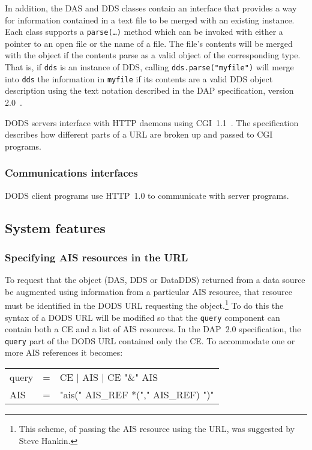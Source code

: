 \documentclass{article}
\begin{document}
In addition, the \ac{DAS} and \ac{DDS} classes contain an interface that
provides a way for information contained in a text file to be merged with an
existing instance.  Each class supports a \texttt{parse(\ldots)} method which
can be invoked with either a pointer to an open file or the name of a file.
The file's contents will be merged with the object if the contents parse as a
valid object of the corresponding type. That is, if \texttt{dds} is an
instance of \ac{DDS}, calling \texttt{dds.parse("myfile")} will merge into
\texttt{dds} the information in \texttt{myfile} if its contents are a valid
\ac{DDS} object description using the text notation described in the \ac{DAP}
specification, version 2.0~\cite{gallagher:dap-spec}.

\ac{DODS} servers interface with \ac{HTTP} daemons using
\ac{CGI}~1.1~\cite{w3c:cgi}. The specification describes how different parts
of a \ac{URL} are broken up and passed to \ac{CGI} programs.

\subsubsection{Communications interfaces}
\ac{DODS} client programs use HTTP~1.0 to communicate with server programs.

\subsection{System features}

\subsubsection{Specifying \ac{AIS} resources in the \ac{URL}}
\label{sec:url}
To request that the object (\ac{DAS}, \ac{DDS} or \ac{DataDDS}) returned from
a data source be augmented using information from a particular \ac{AIS}
resource, that resource must be \cbstart identified \cbend in the \ac{DODS}
\ac{URL} requesting the object.\footnote{This scheme, of passing the \ac{AIS}
  resource using the \ac{URL}, was suggested by Steve Hankin.} To do this the
syntax of a \ac{DODS} \ac{URL} will be modified so that the \texttt{query}
component can contain both a \ac{CE} and a list of \ac{AIS} resources. In the
\ac{DAP}~2.0 specification, the \texttt{query} part of the \ac{DODS} \ac{URL}
contained only the \ac{CE}.  To accommodate one or more \ac{AIS} references
it becomes:
\cbstart
\begin{ttfamily}
\begin{center}
\begin{tabular}{lll}
query & = & CE | AIS | CE "\&" AIS\\
AIS & = & "ais(" AIS\_REF *("," AIS\_REF) ")"\\
\end{tabular}
\end{center}
\end{ttfamily}
\end{document}
